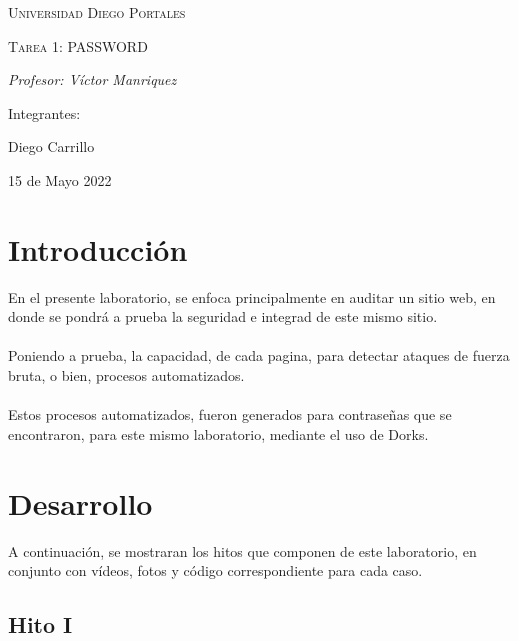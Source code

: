 \documentclass[]{article}
\begin{document}
    \begin{titlepage}
        \centering
        \vspace{1cm}
        {\scshape\Large Universidad Diego Portales \par}
        \vspace{2cm}
        {\scshape\Huge Tarea 1: PASSWORD\par}
        \vspace{1cm}
        \vspace{1cm}
        {\itshape\Large Profesor: Víctor Manriquez \par}
        \vfill
        {\Large Integrantes: \par}
        {\Large Diego Carrillo \par}
        \vfill
        {\Large 15 de Mayo 2022 \par}
    \end{titlepage}

\tableofcontents
 \newpage
 \section{Introducción}
 En el presente laboratorio, se enfoca principalmente en auditar un sitio web, en donde se pondrá a prueba la seguridad e integrad de este mismo sitio. 
 \\\\
 Poniendo a prueba, la capacidad, de cada pagina, para detectar ataques de fuerza bruta, o bien, procesos automatizados.
 \\\\
 Estos procesos automatizados, fueron generados para contraseñas que se encontraron, para este mismo laboratorio, mediante el uso de Dorks. 
\section{Desarrollo}
    A continuación, se mostraran los hitos que componen de este laboratorio, en conjunto con vídeos,
    fotos y código correspondiente para cada caso. 

\subsection{Hito I}
\end{document}
